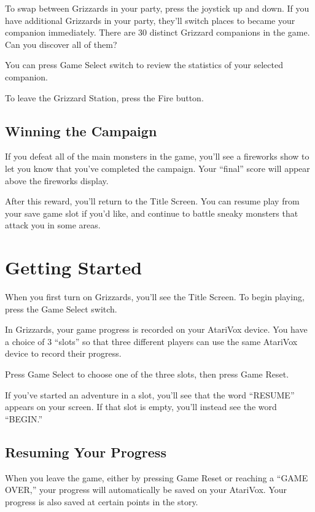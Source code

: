 \documentclass[10pt,twoside,openright]{memoir}
\begin{document}
To swap between Grizzards in your party, press the joystick up and down. If
you have additional Grizzards in your party, they'll switch places to became
your companion immediately. There are 30 distinct Grizzard companions in
the game. Can you discover all of them?

You  can press  Game  Select switch  to review  the  statistics of  your
selected companion.

To leave the Grizzard Station, press the Fire button.


\section{Winning the Campaign}

If you defeat all of the main monsters in the game, you'll see a fireworks
show to let you know that you've completed the campaign. Your ``final''
score will appear above the fireworks display.

After this reward, you'll return to the Title Screen. You can resume play
from your save game slot if you'd like, and continue to battle sneaky
monsters that attack you in some areas.



\chapter{Getting Started}\label{Getting Started}

When you first turn on Grizzards, you'll see the Title
Screen. To begin playing, press the Game Select switch.

In  Grizzards,  your game  progress is  recorded on  your
AtariVox  device. You  have  a choice  of 3  ``slots''  so that  three
different players  can use  the same AtariVox  device to  record their
progress.

Press Game Select to choose one of the three slots, then press Game
Reset.

If you've started an adventure in a slot, you'll see that the word
``RESUME'' appears on your screen. If that slot is empty, you'll
instead see the word ``BEGIN.''

\section{Resuming Your Progress}

When you leave the game, either by pressing Game Reset or reaching a
``GAME OVER,'' your progress will automatically be saved on your
AtariVox. Your progress is also saved at certain points in the story.
\end{document}
